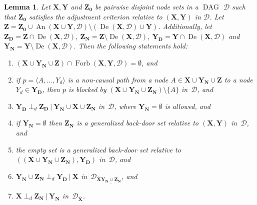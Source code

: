 \documentclass[11pt,a4paper]{article}
\newtheorem{lemma}[definition]{Lemma}
\newcommand\given[1][]{\:#1\vert\:}
\newcommand{\dsepp}{\perp_{d}}
\DeclareMathOperator{\DAG}{DAG}
\DeclareMathOperator{\De}{De}
\DeclareMathOperator{\An}{An}
\DeclareMathOperator{\Forbi}{Forb}
\newcommand{\g}[1][G]{\mathcal{#1}}
\newcommand{\fb}[2][X,Y]{\Forbi(\mathbf{#1},#2)}%
\begin{document}
\begin{lemma} 
Let $\mathbf{X},\mathbf{Y}$ and $\mathbf{Z_0}$ be pairwise disjoint node sets in a $\DAG$ $\g[D]$ such that $\mathbf{Z_0}$ satisfies the adjustment criterion relative to $(\mathbf{X,Y})$ in $\g[D]$. Let $\mathbf{Z} = \mathbf{Z_0} \cup \An(\mathbf{X} \cup \mathbf{Y},\g[D]) \setminus ( \De(\mathbf{X}, \g[D]) \cup \mathbf{Y})$.
Additionally, let $\mathbf{Z_D} = \mathbf{Z} \cap \De(\mathbf{X}, \g[D])$, $\mathbf{Z_N} = \mathbf{Z} \setminus \De(\mathbf{X}, \g[D])$, $\mathbf{Y_D} = \mathbf{Y} \cap \De(\mathbf{X},\g[D])$ and $\mathbf{Y_N} = \mathbf{Y} \setminus \De(\mathbf{X}, \g[D])$.
Then the following statements hold:

\begin{enumerate}[label=(\roman*)]
\item\label{l:g1}  $(\mathbf{X} \cup \mathbf{Y_N} \cup \mathbf{Z}) \cap \fb{\g[D]} = \emptyset$, and

\item\label{l:g2} if $p = \langle A, \dots, Y_d \rangle$ is a non-causal path from a node $A \in \mathbf{X} \cup \mathbf{Y_N} \cup \mathbf{Z}$ to a node $Y_d \in \mathbf{Y_D}$, then $p$ is blocked by $(\mathbf{X} \cup \mathbf{Y_N} \cup \mathbf{Z_N}) \setminus \{A\}$ in~$\g[D]$, and

\item\label{l:s1} $\mathbf{Y_D} \dsepp \mathbf{Z_D} \given \mathbf{Y_N} \cup \mathbf{X} \cup \mathbf{Z_N}$ in~$\g[D]$, where $\mathbf{Y_N} = \emptyset$ is allowed, and

\item\label{l:s2} if $\mathbf{Y_N} = \emptyset$ then $\mathbf{Z_N}$ is a generalized back-door set relative to $(\mathbf{X,Y})$ in~$\g[D]$, and

\item\label{l:s3}  the empty set is a generalized back-door set relative to $((\mathbf{X} \cup \mathbf{Y_N} \cup \mathbf{Z_N}),\mathbf{Y_D})$ in~$\g[D]$, and

\item\label{l:s4} $\mathbf{Y_N} \cup \mathbf{Z_N} \dsepp \mathbf{Y_D} \given \mathbf{X}$ in~$\g[D]_{\overline{\mathbf{X}}\underline{\mathbf{Y_N} \cup  \mathbf{Z_N}}}$, and

\item\label{l:s5} $\mathbf{X} \dsepp \mathbf{Z_N} \given \mathbf{Y_N}$ in~$\g[D]_{\overline{\mathbf{X}}}$.
\end{enumerate}

\label{lemma:shpitser ynyd}
\end{lemma}
\end{document}
